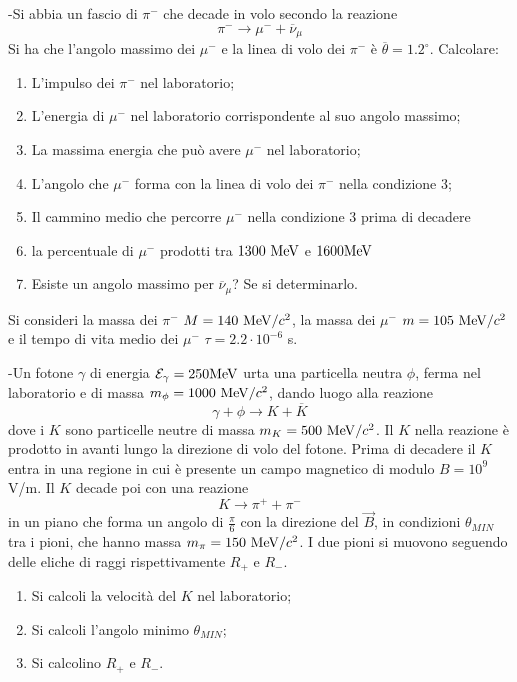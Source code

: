 \documentclass[12pt,twoside,a4]{article}
\begin{document}
\newpage
\begin{esercizio}[Esame 04/02/2014]
	-Si abbia un fascio di $\pi^-$ che decade in volo secondo la reazione
$$ \pi^- \longrightarrow \mu^- + \overline{\nu}_\mu $$
Si ha che l'angolo massimo dei $\mu^-$ e la linea di volo dei $\pi^-$ è $\overline{\theta} = 1.2^\circ$. 
Calcolare:
\begin{enumerate}[label=(\textit{\roman*})]
\item L'impulso dei $\pi^-$ nel laboratorio;
\item L'energia di $\mu^-$ nel laboratorio corrispondente al suo angolo massimo;
\item La massima energia che può avere $\mu^-$ nel laboratorio;
\item L'angolo che $\mu^-$ forma con la linea di volo dei $\pi^-$ nella condizione $3$;
\item Il cammino medio che percorre $\mu^-$ nella condizione $3$ prima di decadere
\item la percentuale di $\mu^-$ prodotti tra $1300 \ \mathrm{MeV}$ e $1600 \mathrm{MeV}$
\item Esiste un angolo massimo per $\overline{\nu}_\mu$? Se si determinarlo.
\end{enumerate}
Si consideri la massa dei $\pi^-$ $M = 140 \ \mathrm{MeV}/c^2$, la massa dei $\mu^-$ $m=105 \ \mathrm{MeV}/c^2$ e il tempo di vita medio dei $\mu^-$ $\tau = 2.2 \cdot 10^{-6}$ s.
\end{esercizio}

\begin{esercizio}[Esame 15/07/2013]
	-Un fotone $\gamma$ di energia $\mathcal{E}_\gamma = 250 \mathrm{MeV}$ urta una particella neutra $\phi$, ferma nel laboratorio e di massa $m_\phi = 1000 \ \mathrm{MeV}/c^2$, dando luogo alla reazione 
$$ \gamma + \phi \longrightarrow K + \overline{K}$$ 
dove i $K$ sono particelle neutre di massa $m_K = 500 \ \mev/c^2$. Il $K$ nella reazione è prodotto in avanti lungo la direzione di volo del fotone. Prima di decadere il $K$ entra in una regione in cui è presente un campo magnetico di modulo $B = 10^9 $ V/m. Il $K$ decade poi con una reazione
$$ K \longrightarrow \pi^+ + \pi^- $$
in un piano che forma un angolo di $\frac{\pi}{6}$ con la direzione del $\vec{B}$, in condizioni $\theta_{MIN}$ tra i pioni, che hanno massa $m_\pi = 150 \ \mev/c^2$. I due pioni si muovono seguendo delle eliche di raggi rispettivamente $R_+$ e $R_-$.
\begin{enumerate}[label=(\textit{\roman*})]
\item Si calcoli la velocità  del $K$ nel laboratorio;
\item Si calcoli l'angolo minimo $\theta_{MIN}$;
\item Si calcolino $R_+$ e $R_-$.
\end{enumerate}
\end{esercizio}
\end{document}
